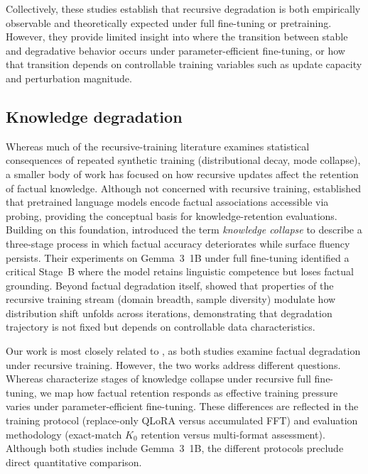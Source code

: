 \documentclass[a4paper,fleqn]{cas-dc}
\begin{document}
Collectively, these studies establish that recursive degradation is both
empirically observable and theoretically expected under full fine-tuning or
pretraining. However, they provide limited insight into where the transition
between stable and degradative behavior occurs under parameter-efficient
fine-tuning, or how that transition depends on controllable training variables
such as update capacity and perturbation magnitude.

\subsection{Knowledge degradation}

Whereas much of the recursive-training literature examines statistical
consequences of repeated synthetic training (distributional decay, mode
collapse), a smaller body of work has focused on how recursive updates affect
the retention of factual knowledge. Although not concerned with recursive
training, \citet{petroni2019} established that pretrained language models encode
factual associations accessible via probing, providing the conceptual basis for
knowledge-retention evaluations. Building on this foundation,
\citet{keisha2025} introduced the term \textit{knowledge collapse} to describe a
three-stage process in which factual accuracy deteriorates while surface fluency
persists. Their experiments on Gemma~3~1B under full fine-tuning identified a
critical Stage~B where the model retains linguistic competence but loses factual
grounding. Beyond factual degradation itself, \citet{kovac2025recursive}
showed that properties of the recursive training stream (domain breadth, sample
diversity) modulate how distribution shift unfolds across iterations,
demonstrating that degradation trajectory is not fixed but depends on
controllable data characteristics.

Our work is most closely related to \citet{keisha2025}, as both studies examine
factual degradation under recursive training. However, the two works address
different questions. Whereas \citet{keisha2025} characterize stages of knowledge
collapse under recursive full fine-tuning, we map how factual retention responds
as effective training pressure varies under parameter-efficient fine-tuning.
These differences are reflected in the training protocol (replace-only QLoRA
versus accumulated FFT) and evaluation methodology (exact-match $K_0$ retention
versus multi-format assessment). Although both studies include Gemma~3~1B, the
different protocols preclude direct quantitative comparison.
\end{document}
